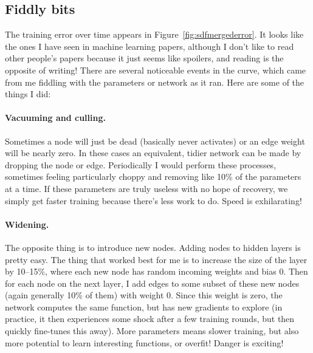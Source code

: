 \documentclass[twocolumn]{article}
\begin{document}
\subsection{Fiddly bits} \label{sec:fiddly}
The training error over time appears in
Figure~\ref{fig:sdfmergederror}. It looks like the ones I have seen in
machine learning papers, although I don't like to read other people's
papers because it just seems like spoilers, and reading is the
opposite of writing! There are several noticeable events in the curve,
which came from me fiddling with the parameters or network as it ran.
Here are some of the things I did:

\paragraph{Vacuuming and culling.} Sometimes a node will just be
dead (basically never activates) or an edge weight will be nearly
zero. In these cases an equivalent, tidier network can be made by
dropping the node or edge. Periodically I would perform these
processes, sometimes feeling particularly choppy and removing like
10\% of the parameters at a time. If these parameters are truly
useless with no hope of recovery, we simply get faster training
because there's less work to do. Speed is exhilarating!

\paragraph{Widening.} The opposite thing is to introduce new nodes.
Adding nodes to hidden layers is pretty easy. The thing that worked
best for me is to increase the size of the layer by 10--15\%, where
each new node has random incoming weights and bias 0. Then for each
node on the next layer, I add edges to some subset of these new nodes
(again generally 10\% of them) with weight 0. Since this weight is
zero, the network computes the same function, but has new gradients
to explore (in practice, it then experiences some shock after a
few training rounds, but then quickly fine-tunes this away). More
parameters means slower training, but also more potential to learn
interesting functions, or overfit! Danger is exciting!
\end{document}

